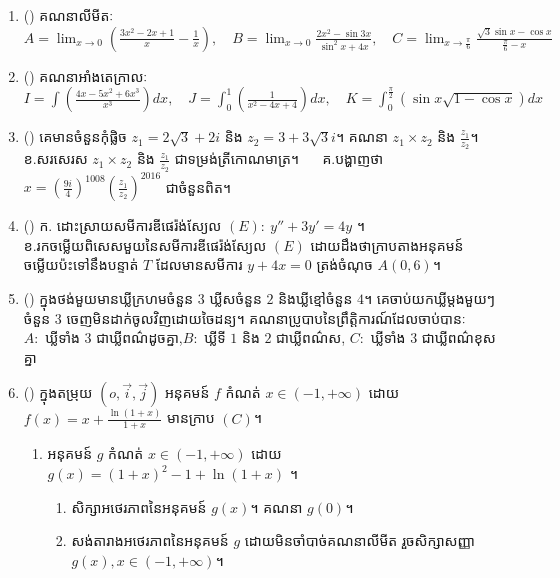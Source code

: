\documentclass{officialexam}
\begin{document}
\begin{enumerate}[I]
	\item {\color{khtug}()} គណនាលីមីតៈ $A=\lim_{x\to0}\left(\frac{3x^2-2x+1}{x}-\frac{1}{x}\right),\quad B=\lim_{x\to0}\frac{2x^2-\sin3x}{\sin^2x+4x},\quad C=\lim_{x\to\frac{\pi}{6}}\frac{\sqrt{3}\sin x-\cos x}{\frac{\pi}{6}-x}$
	\item {\color{khtug}()} គណនាអាំងតេក្រាលៈ​ $I=\int \left(\frac{4x-5x^2+6x^3}{x^3}\right)dx,\quad J=\int_{0}^{1}\left(\frac{1}{x^2-4x+4}\right)dx,\quad K=\int_{0}^{\frac{\pi}{2}}\left(\sin x \sqrt{1-\cos x}\right)dx$
	\item {\color{khtug}()} គេមានចំនួនកុំផ្លិច $z_1=2\sqrt{3}+2i$ និង $z_2=3+3\sqrt{3}i$។ គណនា $z_1\times z_2$ និង $\frac{z_1}{z_2}$។\\
	{\color{khtug}ខ.}សរសេរស $z_1\times z_2$ និង $\frac{z_1}{z_2}$ ជាទម្រង់ត្រីកោណមាត្រ។ $\quad$ {\color{khtug}គ.}បង្ហាញថា $x=\left(\frac{9i}{4}\right)^{1008}\left(\frac{z_1}{z_2}\right)^{2016}$ ជាចំនួនពិត។
	\item {\color{khtug}()} {\color{khtug}ក.} ដោះស្រាយសមីការឌីផេរ៉ង់ស្យែល $\left(E\right):~y''+3y'=4y$ ។\\
	{\color{khtug}ខ.}រកចម្លើយពិសេសមួយនៃសមីការឌីផេរ៉ង់ស្យែល $\left(E\right)$ ដោយដឹងថាក្រាបតាងអនុគមន៍ចម្លើយប៉ះទៅនឹងបន្ទាត់ $T$ ដែលមានសមីការ $y+4x=0$ ត្រង់ចំណុច $A\left(0,6\right)$។ 
	\item {\color{khtug}()} ក្នុងថង់មួយមានឃ្លីក្រហមចំនួន $3$ ឃ្លីសចំនួន $2$ និងឃ្លីខ្មៅចំនួន $4$។ គេចាប់យកឃ្លីម្តងមួយៗចំនួន $3$ ចេញមិនដាក់ចូលវិញដោយចៃដន្យ។ គណនាប្រូបាបនៃព្រឹត្តិការណ៍ដែលចាប់បានៈ\\
	$A:$ ឃ្លីទាំង $3$ ជាឃ្លីពណ៌ដូចគ្នា,\quad $B:$ ឃ្លីទី $1$ និង $2$ ជាឃ្លីពណ៌ស, \quad $C:$ ឃ្លីទាំង $3$ ជាឃ្លីពណ៌ខុសគ្នា
	\item {\color{khtug}()} ក្នុងតម្រុយ $\left(o,\vec{i},\vec{j}\right)$ អនុគមន៍ $f$ កំណត់ $x\in\left(-1,+\infty\right)$ ដោយ $f(x)=x+\frac{\ln\left(1+x\right)}{1+x}$ មានក្រាប $\left(C\right)$។ 
	\begin{enumerate}[m]
		\item អនុគមន៍ $g$ កំណត់ $x\in\left(-1,+\infty\right)$ ដោយ $g(x)=\left(1+x\right)^2-1+\ln\left(1+x\right)$ ។
		\begin{enumerate}[k]
			\item សិក្សាអថេរភាពនៃអនុគមន៍ $g(x)$។ គណនា $g(0)$។
			\item សង់តារាងអថេរភាពនៃអនុគមន៍ $g$ ដោយមិនចាំបាច់គណនាលីមីត រួចសិក្សាសញ្ញា $g(x), x\in\left(-1,+\infty\right)$។

\end{enumerate}
\end{enumerate}
\end{enumerate}
\end{document}
